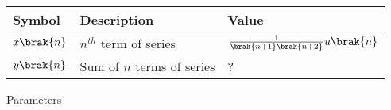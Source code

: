 \setlength{\arrayrulewidth}{0.3mm}
\setlength{\tabcolsep}{15pt}
\renewcommand{\arraystretch}{1.5}



\begin{tabular}{ |p{1cm}|p{2cm}|p{2cm}| }
\hline
Symbol & Description & Value\\
\hline
$x\brak{n}$ & $n^{th}$ term of series & $\frac{1}{\brak{n+1}\brak{n+2}} u\brak{n}$\\
\hline
$y\brak{n}$ & Sum of $n$ terms of series & ?\\
\hline
\end{tabular}
\caption{Parameters}



